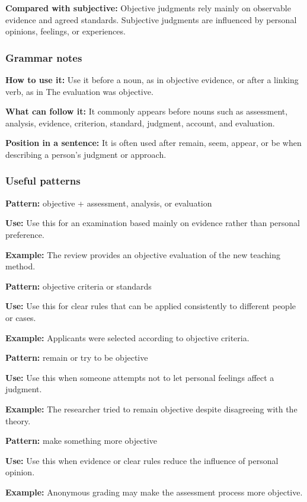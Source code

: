 \documentclass[11pt]{article}
\begin{document}
\textbf{Compared with subjective:} Objective judgments rely mainly on observable evidence and agreed standards. Subjective judgments are influenced by personal opinions, feelings, or experiences.

\subsubsection{Grammar notes}
\textbf{How to use it:} Use it before a noun, as in objective evidence, or after a linking verb, as in The evaluation was objective.

\textbf{What can follow it:} It commonly appears before nouns such as assessment, analysis, evidence, criterion, standard, judgment, account, and evaluation.

\textbf{Position in a sentence:} It is often used after remain, seem, appear, or be when describing a person's judgment or approach.

\subsubsection{Useful patterns}
\textbf{Pattern:} objective + assessment, analysis, or evaluation

\textbf{Use:} Use this for an examination based mainly on evidence rather than personal preference.

\textbf{Example:} The review provides an objective evaluation of the new teaching method.

\textbf{Pattern:} objective criteria or standards

\textbf{Use:} Use this for clear rules that can be applied consistently to different people or cases.

\textbf{Example:} Applicants were selected according to objective criteria.

\textbf{Pattern:} remain or try to be objective

\textbf{Use:} Use this when someone attempts not to let personal feelings affect a judgment.

\textbf{Example:} The researcher tried to remain objective despite disagreeing with the theory.

\textbf{Pattern:} make something more objective

\textbf{Use:} Use this when evidence or clear rules reduce the influence of personal opinion.

\textbf{Example:} Anonymous grading may make the assessment process more objective.
\end{document}
